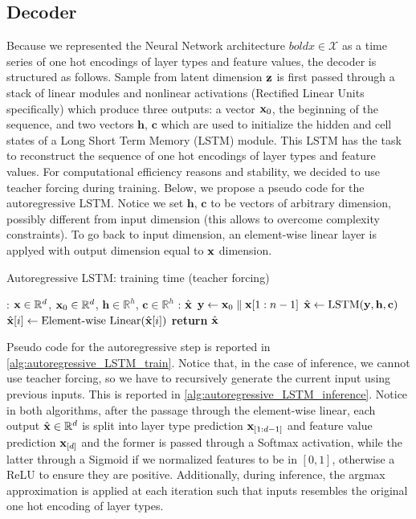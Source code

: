 \documentclass[12pt]{article}
\begin{document}
\subsection{Decoder}

Because we represented the Neural Network architecture \(boldx \in \mathcal{X}\) as a time series of one hot encodings of layer types and feature values, the decoder is structured as follows. Sample from latent dimension \(\textbf{z}\) is first passed through a stack of linear modules and nonlinear activations (Rectified Linear Units specifically) which produce three outputs: a vector \(\textbf{x}_0\), the beginning of the sequence, and two vectors \(\mathbf{h}\), \(\mathbf{c}\) which are used to initialize the hidden and cell states of a Long Short Term Memory (LSTM) module. This LSTM has the task to reconstruct the sequence of one hot encodings of layer types and feature values. For computational efficiency reasons and stability, we decided to use teacher forcing during training. Below, we propose a pseudo code for the autoregressive LSTM. Notice we set \(\mathbf{h}\), \(\mathbf{c}\) to be vectors of arbitrary dimension, possibly different from input dimension (this allows to overcome complexity constraints). To go back to input dimension, an element-wise linear layer is applyed with output dimension equal to \(\textbf{x}\) dimension.

\begin{algorithm}
    \label{alg:autoregressive_LSTM_train}
    \caption{Autoregressive LSTM: training time (teacher forcing)}
    \begin{algorithmic}
        \Input: \(\textbf{x} \in \mathbb{R}^d\), \(\textbf{x}_0 \in \mathbb{R}^d\), \(\mathbf{h} \in \mathbb{R}^h\), \(\mathbf{c} \in \mathbb{R}^h\)
        \Output: \(\hat{\textbf{x}}\)
        \State \(\mathbf{y} \leftarrow \textbf{x}_0 \parallel \textbf{x}[1:n-1]\)  
        \State \(\hat{\textbf{x}} \leftarrow \text{LSTM}(\mathbf{y}, \mathbf{h}, \mathbf{c})\)
            \State \(\hat{\textbf{x}}[i] \leftarrow \text{Element-wise Linear}(\hat{\textbf{x}}[i])\)
        \EndFor
        \State \textbf{return} \(\hat{\textbf{x}}\)
    \end{algorithmic}
\end{algorithm}

Pseudo code for the autoregressive step is reported in \ref{alg:autoregressive_LSTM_train}. Notice that, in the case of inference, we cannot use teacher forcing, so we have to recursively generate the current input using previous inputs. This is reported in \ref{alg:autoregressive_LSTM_inference}. Notice in both algorithms, after the passage through the element-wise linear, each output \(\hat{\textbf{x}} \in \mathbb{R}^d\) is split into layer type prediction \(\textbf{x}_{[1:d-1]}\) and feature value prediction \(\textbf{x}_{[d]}\) and the former is passed through a Softmax activation, while the latter through a Sigmoid if we normalized features to be in \([0,1]\), otherwise a ReLU to ensure they are positive. Additionally, during inference, the argmax approximation is applied at each iteration such that inputs resembles the original one hot encoding of layer types.
\end{document}
